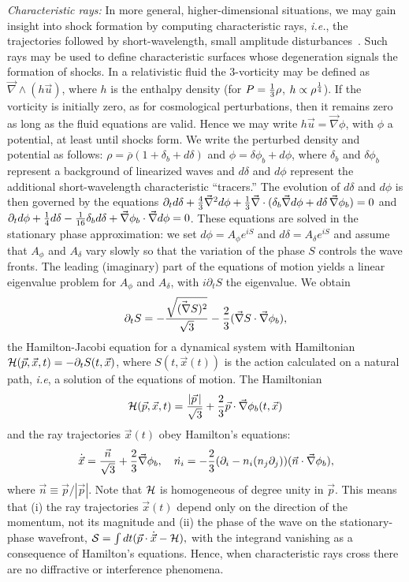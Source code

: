 \documentclass[prl,aps,10pt,twocolumn,showkeys,nofootinbib]{revtex4-1}
\def\ben{\begin{equation}}
\def\een{\end{equation}}
\begin{document}
{\it Characteristic rays:} In more general, higher-dimensional situations, we may gain insight into shock formation by computing characteristic rays, {\it i.e.}, the trajectories followed by short-wavelength, small amplitude disturbances~\cite{LL}. Such rays may be used to define characteristic surfaces whose degeneration signals the formation of shocks. In a relativistic fluid the 3-vorticity may be defined as $\vec{\nabla}\wedge (h \vec{u})$, where $h$ is the enthalpy density (for $P={1\over 3} \rho$, $h\propto \rho^{1\over 4}$). If the vorticity is initially zero, as for cosmological perturbations, then it remains zero as long as the fluid equations are valid. Hence we may write $h \vec{u}=\vec{\nabla} \phi$, with $\phi$ a potential, at least until shocks form. We write the perturbed density and potential as follows: $\rho=\overline{\rho}(1+\delta_b+d \delta)$ and  $\phi=\delta \phi_{b}+ d\phi$, where $\delta_{b}$ and $\delta \phi_{b}$ represent a background of linearized waves and $d \delta$ and $d \phi$ represent the additional short-wavelength characteristic ``tracers.'' The evolution of $d \delta $ and $d \phi$ is then governed by the equations $\partial_t d \delta+{4\over 3} \vec{\nabla}^2 d \phi +{1\over 3} \vec{\nabla}\cdot (\delta_{b}\vec{\nabla}d\phi+d \delta \,\vec{\nabla}\phi_{b} )=0$ and $\partial_t d \phi +{1\over 4} d \delta  - {1\over 16} \delta _{b} d\delta+\vec{\nabla}\phi_{b}\cdot\vec{\nabla} d\phi=0$. These equations are solved in the stationary phase approximation: we set $d\phi=A_\phi e^{i {S}}$ and $d\delta=A_\delta e^{i {S}}$ and assume that $A_\phi$ and $A_\delta$ vary slowly so that the variation of the phase $S$ controls the wave fronts. The leading (imaginary) part of the equations of motion yields a linear eigenvalue problem for $A_\phi$ and $A_\delta$, with $i\partial_t S$ the eigenvalue.  We obtain
\ben
\partial_t  { S}=-{\sqrt{\vec{(\nabla}S)^2}\over \sqrt{3}}-{2\over 3} (\vec{\nabla}S \cdot\vec{\nabla}\phi_{b}),
\label{eq4}
\een
the Hamilton-Jacobi equation for a dynamical system with Hamiltonian ${\cal H}(\vec{p},\vec{x},t) =-\partial_t  {S}(t,\vec{x})$, where ${ S}(t,\vec{x}(t))$ is the action calculated on a natural path, {\it i.e}, a solution of the equations of motion. The Hamiltonian
\ben
{\cal H}(\vec{p},\vec{x},t) ={|\vec{p}\,|\over \sqrt{3}}+{2\over 3} \vec{p} \cdot\vec{\nabla}\phi_{b}(t,\vec{x})
\label{eq5}
\een
and the ray trajectories $\vec{x}(t)$ obey Hamilton's equations:
\ben
\dot{\vec{x}}={\vec{n}\over \sqrt{3}} +{2\over 3} \vec{\nabla}\phi_{b}, \quad \dot{n_i}=-{2\over 3} (\partial_i-n_i(n_j\partial_j))(\vec{n}\cdot \vec{\nabla}\phi_{b}),
\label{eq6}
\een
where $\vec{n}\equiv \vec{p}/|\vec{p}|$. Note that ${\cal H}$  is homogeneous of degree unity in $\vec{p}$. This means that (i) the ray trajectories $\vec{x}(t)$ depend only on the direction of the momentum, not its magnitude and (ii) the phase of the wave on the stationary-phase wavefront,  ${\cal S}=\int dt( \vec{p}\cdot\dot{\vec{x}} -{\cal H}),$ with the integrand vanishing as a consequence of Hamilton's equations. Hence, when characteristic rays cross there are no diffractive or interference phenomena.
\end{document}
